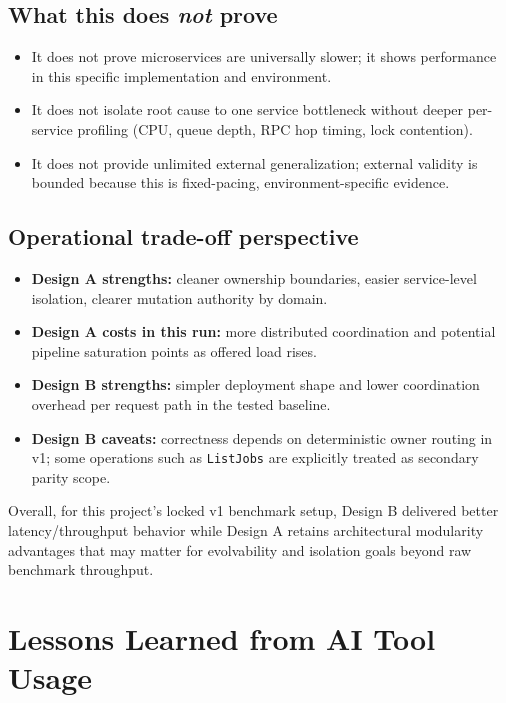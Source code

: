 \documentclass[11pt]{article}
\begin{document}
\subsection{What this does \emph{not} prove}
\begin{itemize}
    \item It does not prove microservices are universally slower; it shows performance in this specific implementation and environment.
    \item It does not isolate root cause to one service bottleneck without deeper per-service profiling (CPU, queue depth, RPC hop timing, lock contention).
    \item It does not provide unlimited external generalization; external validity is bounded because this is fixed-pacing, environment-specific evidence.
\end{itemize}

\subsection{Operational trade-off perspective}
\begin{itemize}
    \item \textbf{Design A strengths:} cleaner ownership boundaries, easier service-level isolation, clearer mutation authority by domain.
    \item \textbf{Design A costs in this run:} more distributed coordination and potential pipeline saturation points as offered load rises.
    \item \textbf{Design B strengths:} simpler deployment shape and lower coordination overhead per request path in the tested baseline.
    \item \textbf{Design B caveats:} correctness depends on deterministic owner routing in v1; some operations such as \texttt{ListJobs} are explicitly treated as secondary parity scope.
\end{itemize}

Overall, for this project's locked v1 benchmark setup, Design B delivered better latency/throughput behavior while Design A retains architectural modularity advantages that may matter for evolvability and isolation goals beyond raw benchmark throughput.

\section{Lessons Learned from AI Tool Usage}
\end{document}
